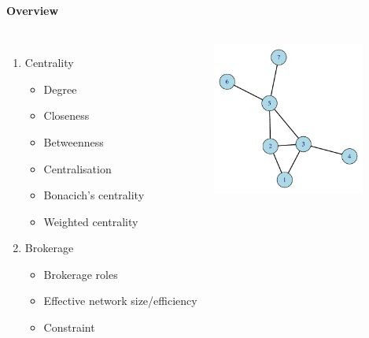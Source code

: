 \documentclass[8pt]{beamer}
\begin{document}
\bgroup
{}
\begin{frame}[plain]{}
\begin{center}
\color{white}{\Huge\insertsection}
\end{center}
\end{frame}
\egroup


\begin{frame}
\frametitle{\insertsection}
\framesubtitle{Overview}

\begin{columns}

\begin{enumerate}
\item Centrality
    \begin{itemize}
    \item Degree
    \item Closeness
    \item Betweenness
    \item Centralisation
    \item Bonacich's centrality
    \item Weighted centrality
    \end{itemize}
    
\medskip    

\item Brokerage
    \begin{itemize} 
    \item Brokerage roles
    \item Effective network size/efficiency
    \item Constraint
    \end{itemize}
\end{enumerate}


\centering
\includegraphics[width=5cm]{base}\\
\color{red}{\footnotesize Note: We will focus on\\ undirected and unweighted networks}

            
\end{columns}

\end{frame}
\end{document}
